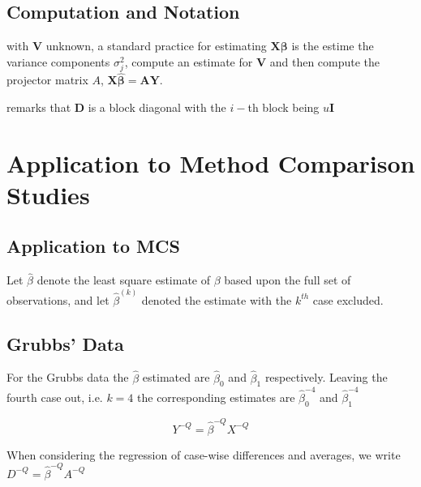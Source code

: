 \documentclass[12pt, a4paper]{report}
\theoremstyle{plain}
\theoremstyle{definition}
\theoremstyle{remark}
\begin{document}
	
	\section{Computation and Notation } %
	with $\boldsymbol{V}$ unknown, a standard practice for estimating $\boldsymbol{X \beta}$ is the estime the variance components $\sigma^2_j$,
	compute an estimate for $\boldsymbol{V}$ and then compute the projector matrix $A$, $\boldsymbol{X \hat{\beta}}  = \boldsymbol{AY}$.
	
	
	\citet{Zewotir} remarks that $\boldsymbol{D}$ is a block diagonal with the $i-$th block being $u \boldsymbol{I}$
	
	
	

\chapter{Application to Method Comparison Studies} %



\section{Application to MCS} %

Let $\hat{\beta}$ denote the least square estimate of $\beta$
based upon the full set of observations, and let
$\hat{\beta}^{(k)}$ denoted the estimate with the $k^{th}$ case
excluded.


\section{Grubbs' Data} %

For the Grubbs data the $\hat{\beta}$ estimated are
$\hat{\beta}_{0}$ and $\hat{\beta}_{1}$ respectively. Leaving the
fourth case out, i.e. $k=4$ the corresponding estimates are
$\hat{\beta}_{0}^{-4}$ and $\hat{\beta}_{1}^{-4}$


\begin{equation}
Y^{-Q} = \hat{\beta}^{-Q}X^{-Q}
\end{equation}

When considering the regression of case-wise differences and averages, we write $D^{-Q} = \hat{\beta}^{-Q}A^{-Q}$


\newpage
\end{document}
